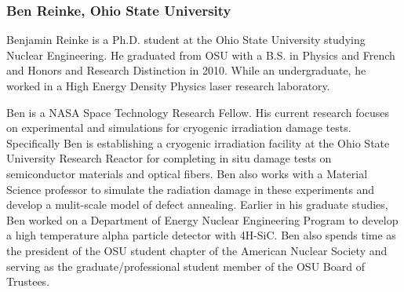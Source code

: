 \subsubsection*{Ben Reinke, Ohio State University}

Benjamin Reinke is a Ph.D. student at the Ohio State University studying Nuclear
Engineering. He graduated from OSU with a B.S. in Physics and French and Honors
and Research Distinction in 2010. While an undergraduate, he worked in a High
Energy Density Physics laser research laboratory.

Ben is a NASA Space Technology Research Fellow. His current research focuses on
experimental and simulations for cryogenic irradiation damage
tests. Specifically Ben is establishing a cryogenic irradiation facility at the
Ohio State University Research Reactor for completing in situ damage tests on
semiconductor materials and optical fibers. Ben also works with a Material
Science professor to simulate the radiation damage in these experiments and
develop a mulit-scale model of defect annealing. Earlier in his graduate
studies, Ben worked on a Department of Energy Nuclear Engineering Program to
develop a high temperature alpha particle detector with 4H-SiC. Ben also spends
time as the president of the OSU student chapter of the American Nuclear Society
and serving as the graduate/professional student member of the OSU Board of
Trustees.
